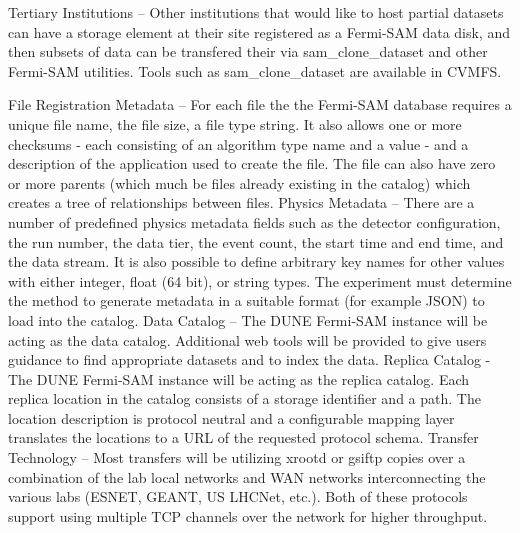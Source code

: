 Tertiary Institutions -- Other institutions that would like to host partial datasets can have a storage element at their site registered as a Fermi-SAM data disk, and then subsets of data can be transfered their via sam_clone_dataset and other Fermi-SAM utilities. Tools such as sam_clone_dataset are available in CVMFS.

File Registration
Metadata -- For each file the the Fermi-SAM database requires a unique file name, the file size, a file type string. It also allows one or more checksums - each consisting of an algorithm type name and a value - and a description of the application used to create the file. The file can also have zero or more parents (which much be files already existing in the catalog) which creates a tree of relationships between files.
Physics Metadata -- There are a number of predefined physics metadata fields such as the detector configuration, the run number, the data tier, the event count, the start time and end time, and the data stream. It is also possible to define arbitrary key names for other values with either integer, float (64 bit), or string types.
The experiment must determine the method to generate metadata in a suitable format (for example JSON) to load into the catalog.
Data Catalog -- The DUNE Fermi-SAM instance will be acting as the data catalog.  Additional web tools will be provided to give users guidance to find appropriate datasets and to index the data.
Replica Catalog - The DUNE Fermi-SAM instance will be acting as the replica catalog.
Each replica location in the catalog consists of a storage identifier and a path. The location description is protocol neutral and a configurable mapping layer translates the locations to a URL of the requested protocol schema.
Transfer Technology -- Most transfers will be utilizing xrootd or gsiftp copies over a combination of the lab local networks and WAN networks interconnecting the various labs (ESNET, GEANT, US LHCNet, etc.).  Both of these protocols support using multiple TCP channels over the network for higher throughput.

